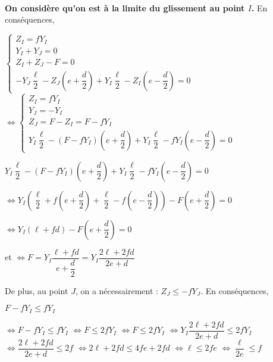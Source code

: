 \ifprof
\begin{corrige}~\\

\textbf{On considère qu'on est à la limite du glissement au point $I$.}
  En conséquences, 

$
\left\{
\begin{array}{l}
Z_I =  fY_I  \\
Y_I + Y_J = 0 \\
Z_I + Z_J -F = 0 \\ 
-Y_J \dfrac{\ell}{2}-Z_J \left(e+\dfrac{d}{2}\right) 
+Y_I \dfrac{\ell}{2}-Z_I \left(e-\dfrac{d}{2}\right) = 0
\end{array}
\right.$
$
\Leftrightarrow
\left\{
\begin{array}{l}
Z_I =  fY_I  \\
Y_J = -Y_I \\
Z_J=F-Z_I =F-fY_I  \\ 
Y_I \dfrac{\ell}{2}-\left( F-fY_I\right) \left(e+\dfrac{d}{2}\right) 
+Y_I \dfrac{\ell}{2}-fY_I \left(e-\dfrac{d}{2}\right) = 0
\end{array}
\right.$

$Y_I \dfrac{\ell}{2}-\left( F-fY_I\right) \left(e+\dfrac{d}{2}\right) 
+Y_I \dfrac{\ell}{2}-fY_I \left(e-\dfrac{d}{2}\right) = 0$

$\Leftrightarrow Y_I\left(  \dfrac{\ell}{2}+ f \left(e+\dfrac{d}{2}\right) 
+\dfrac{\ell}{2}-f \left(e-\dfrac{d}{2}\right)\right) - F\left(e+\dfrac{d}{2}\right) = 0$

$\Leftrightarrow Y_I\left(  \ell+fd \right) - F\left(e+\dfrac{d}{2}\right) = 0$
 
 et $\Leftrightarrow F = Y_I \dfrac{\ell+fd }{e+\dfrac{d}{2}}= Y_I \dfrac{2\ell+2fd }{2e+d}$

De plus, au point $J$, on a nécessairement : 
$Z_J\leq -fY_J $. En conséquences, 

$F-fY_I \leq fY_I $

$\Leftrightarrow F-fY_I \leq fY_I $
$\Leftrightarrow F \leq 2fY_I $
$\Leftrightarrow F \leq 2fY_I $
$\Leftrightarrow  Y_I \dfrac{2\ell+2fd }{2e+d}\leq 2fY_I $
$\Leftrightarrow  \dfrac{2\ell+2fd }{2e+d}\leq 2f$
$\Leftrightarrow  2\ell+2fd \leq 4f e+2fd $
$\Leftrightarrow  \ell \leq 2f e $
$\Leftrightarrow  \dfrac{\ell}{2e} \leq f $
\end{corrige}

